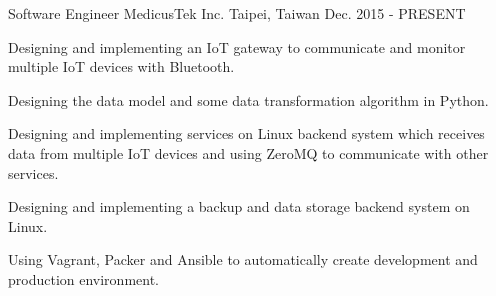 

\begin{cventries}

  \cventry
    {Software Engineer} %
    {MedicusTek Inc.} %
    {Taipei, Taiwan} %
    {Dec. 2015 - PRESENT} %
    {
      \begin{cvitems} %
        \item {Designing and implementing an IoT gateway to communicate and monitor multiple IoT devices with Bluetooth.}
        \item {Designing the data model and some data transformation algorithm in Python.}
        \item {Designing and implementing services on Linux backend system which receives data from multiple IoT devices and using ZeroMQ to communicate with other services.}
        \item {Designing and implementing a backup and data storage backend system on Linux.}
        \item {Using Vagrant, Packer and Ansible to automatically create development and production environment.}
      \end{cvitems}
    }

\end{cventries}
